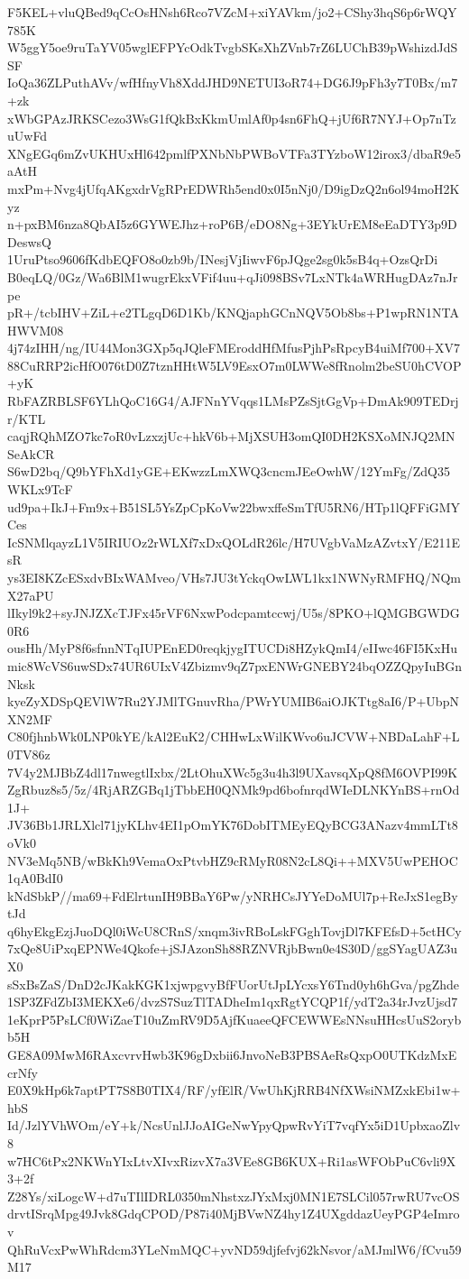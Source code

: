 F5KEL+vluQBed9qCcOsHNsh6Rco7VZcM+xiYAVkm/jo2+CShy3hqS6p6rWQY785K
W5ggY5oe9ruTaYV05wglEFPYcOdkTvgbSKsXhZVnb7rZ6LUChB39pWshizdJdSSF
IoQa36ZLPuthAVv/wfHfnyVh8XddJHD9NETUI3oR74+DG6J9pFh3y7T0Bx/m7+zk
xWbGPAzJRKSCezo3WsG1fQkBxKkmUmlAf0p4sn6FhQ+jUf6R7NYJ+Op7nTzuUwFd
XNgEGq6mZvUKHUxHl642pmlfPXNbNbPWBoVTFa3TYzboW12irox3/dbaR9e5aAtH
mxPm+Nvg4jUfqAKgxdrVgRPrEDWRh5end0x0I5nNj0/D9igDzQ2n6ol94moH2Kyz
n+pxBM6nza8QbAI5z6GYWEJhz+roP6B/eDO8Ng+3EYkUrEM8eEaDTY3p9DDeswsQ
1UruPtso9606fKdbEQFO8o0zb9b/INesjVjIiwvF6pJQge2sg0k5sB4q+OzsQrDi
B0eqLQ/0Gz/Wa6BlM1wugrEkxVFif4uu+qJi098BSv7LxNTk4aWRHugDAz7nJrpe
pR+/tcbIHV+ZiL+e2TLgqD6D1Kb/KNQjaphGCnNQV5Ob8bs+P1wpRN1NTAHWVM08
4j74zIHH/ng/IU44Mon3GXp5qJQleFMEroddHfMfusPjhPsRpcyB4uiMf700+XV7
88CuRRP2icHfO076tD0Z7tznHHtW5LV9EsxO7m0LWWe8fRnolm2beSU0hCVOP+yK
RbFAZRBLSF6YLhQoC16G4/AJFNnYVqqs1LMsPZsSjtGgVp+DmAk909TEDrjr/KTL
caqjRQhMZO7kc7oR0vLzxzjUc+hkV6b+MjXSUH3omQI0DH2KSXoMNJQ2MNSeAkCR
S6wD2bq/Q9bYFhXd1yGE+EKwzzLmXWQ3cncmJEeOwhW/12YmFg/ZdQ35WKLx9TcF
ud9pa+IkJ+Fm9x+B51SL5YsZpCpKoVw22bwxffeSmTfU5RN6/HTp1lQFFiGMYCes
IcSNMlqayzL1V5IRIUOz2rWLXf7xDxQOLdR26lc/H7UVgbVaMzAZvtxY/E211EsR
ys3EI8KZcESxdvBIxWAMveo/VHs7JU3tYckqOwLWL1kx1NWNyRMFHQ/NQmX27aPU
lIkyl9k2+syJNJZXcTJFx45rVF6NxwPodcpamtccwj/U5s/8PKO+lQMGBGWDG0R6
ousHh/MyP8f6sfnnNTqIUPEnED0reqkjygITUCDi8HZykQmI4/eIIwc46FI5KxHu
mic8WcVS6uwSDx74UR6UIxV4Zbizmv9qZ7pxENWrGNEBY24bqOZZQpyIuBGnNksk
kyeZyXDSpQEVlW7Ru2YJMlTGnuvRha/PWrYUMIB6aiOJKTtg8aI6/P+UbpNXN2MF
C80fjhnbWk0LNP0kYE/kAl2EuK2/CHHwLxWilKWvo6uJCVW+NBDaLahF+L0TV86z
7V4y2MJBbZ4dl17nwegtlIxbx/2LtOhuXWc5g3u4h3l9UXavsqXpQ8fM6OVPI99K
ZgRbuz8s5/5z/4RjARZGBq1jTbbEH0QNMk9pd6bofnrqdWIeDLNKYnBS+rnOd1J+
JV36Bb1JRLXlcl71jyKLhv4EI1pOmYK76DobITMEyEQyBCG3ANazv4mmLTt8oVk0
NV3eMq5NB/wBkKh9VemaOxPtvbHZ9cRMyR08N2cL8Qi++MXV5UwPEHOC1qA0BdI0
kNdSbkP//ma69+FdElrtunIH9BBaY6Pw/yNRHCsJYYeDoMUl7p+ReJxS1egBytJd
q6hyEkgEzjJuoDQl0iWcU8CRnS/xnqm3ivRBoLskFGghTovjDl7KFEfsD+5ctHCy
7xQe8UiPxqEPNWe4Qkofe+jSJAzonSh88RZNVRjbBwn0e4S30D/ggSYagUAZ3uX0
sSxBsZaS/DnD2cJKakKGK1xjwpgvyBfFUorUtJpLYcxsY6Tnd0yh6hGva/pgZhde
1SP3ZFdZbI3MEKXe6/dvzS7SuzTlTADheIm1qxRgtYCQP1f/ydT2a34rJvzUjsd7
1eKprP5PsLCf0WiZaeT10uZmRV9D5AjfKuaeeQFCEWWEsNNsuHHcsUuS2orybb5H
GE8A09MwM6RAxcvrvHwb3K96gDxbii6JnvoNeB3PBSAeRsQxpO0UTKdzMxEcrNfy
E0X9kHp6k7aptPT7S8B0TIX4/RF/yfElR/VwUhKjRRB4NfXWsiNMZxkEbi1w+hbS
Id/JzlYVhWOm/eY+k/NcsUnlJJoAIGeNwYpyQpwRvYiT7vqfYx5iD1UpbxaoZlv8
w7HC6tPx2NKWnYIxLtvXIvxRizvX7a3VEe8GB6KUX+Ri1asWFObPuC6vli9X3+2f
Z28Ys/xiLogcW+d7uTIlIDRL0350mNhstxzJYxMxj0MN1E7SLCil057rwRU7vcOS
drvtISrqMpg49Jvk8GdqCPOD/P87i40MjBVwNZ4hy1Z4UXgddazUeyPGP4eImrov
QhRuVcxPwWhRdcm3YLeNmMQC+yvND59djfefvj62kNsvor/aMJmlW6/fCvu59M17
